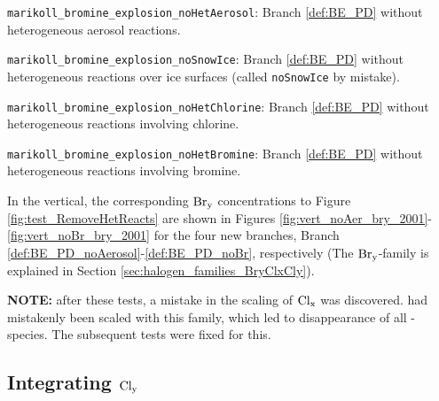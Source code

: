 \begin{mydef}\label{def:BE_PD_noAerosol}
    \texttt{marikoll\_bromine\_explosion\_noHetAerosol}: Branch \ref{def:BE_PD} without heterogeneous aerosol reactions.
\end{mydef}

\begin{mydef}\label{def:BE_PD_noIce}
    \texttt{marikoll\_bromine\_explosion\_noSnowIce}: Branch \ref{def:BE_PD} without heterogeneous reactions over ice surfaces (called \texttt{noSnowIce} by mistake).
\end{mydef}

\begin{mydef}\label{def:BE_PD_noCl}
    \texttt{marikoll\_bromine\_explosion\_noHetChlorine}: Branch \ref{def:BE_PD} without heterogeneous reactions involving chlorine.
\end{mydef}

\begin{mydef}\label{def:BE_PD_noBr}
    \texttt{marikoll\_bromine\_explosion\_noHetBromine}: Branch \ref{def:BE_PD} without heterogeneous reactions involving bromine.
\end{mydef}








\medskip

In the vertical, the corresponding $\mathrm{Br_y}$ concentrations to Figure \ref{fig:test_RemoveHetReacts} are shown in Figures \ref{fig:vert_noAer_bry_2001}-\ref{fig:vert_noBr_bry_2001} for the four new branches, Branch \ref{def:BE_PD_noAerosol}-\ref{def:BE_PD_noBr}, respectively (The $\mathrm{Br_y}$-family is explained in Section \ref{sec:halogen_families_BryClxCly}). 












\textbf{NOTE:} after these tests, a mistake in the scaling of $\mathrm{Cl_x}$ was discovered.  had mistakenly been scaled with this family, which led to disappearance of all -species. The subsequent tests were fixed for this.

\subsection{Integrating $\mathrm{Cl_y}$}

